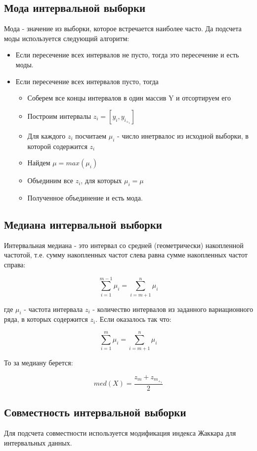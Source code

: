 \documentclass[12pt,a4paper]{article}
\begin{document}
    \subsection{Мода интервальной выборки}
    Мода - значение из выборки, которое встречается наиболее часто. Да подсчета моды используется следующий алгоритм:
    \begin{itemize}
        \item Если пересечение всех интервалов не пусто, тогда это пересечение и есть моды.
        \item Если пересечение всех интервалов пусто, тогда
        \begin{itemize}
            \item Соберем все концы интервалов в один массив Y и отсортируем его 
            \item Построим интервалы $ z_i = [y_i, y_i_+_1]$
            \item Для каждого $z_i$ посчитаем $\mu_i$ - число инетрвалос из исходной выборки, в которой содержится $z_i$
            \item Найдем $\mu = max(\mu_i)$
            \item Объединим все $z_i$, для которых $\mu_i = \mu$
            \item Полученное объединение и есть мода.
        \end{itemize}
    \end{itemize}

    \subsection{Медиана интервальной выборки}

    Интервальная медиана - это интервал со средней (геометрически) накопленной частотой, т.е. сумму накопленных частот слева равна сумме накопленных частот справа:

    \[ \sum_{i=1}^{m-1} \mu_i = \sum_{i=m+1}^{n} \mu_i \]


    где $\mu_i$ - частота интервала  $z_i$ - количество интервалов из заданного вариационного ряда, в которых содержится $z_i$. Если оказалось так что:
    
    \[ \sum_{i=1}^{m} \mu_i = \sum_{i=m+1}^{n} \mu_i \]

    То за медиану берется:

     \[  med(X) = \frac{z_m + z_m_+_1}{2}  \]

     \subsection{Совместность интервальной выборки}
     Для подсчета совместности используется модификация индекса Жаккара для интервальных данных. 
\end{document}
